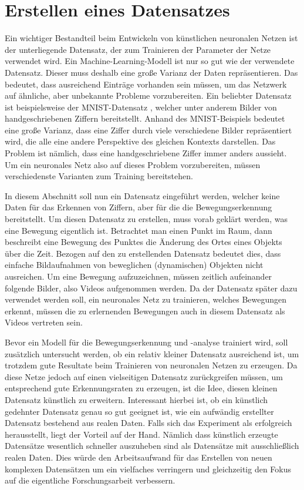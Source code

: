 \chapter{Erstellen eines Datensatzes}\label{chapter:dataset}
Ein wichtiger Bestandteil beim Entwickeln von künstlichen neuronalen Netzen ist
der unterliegende Datensatz, der zum Trainieren der Parameter der Netze
verwendet wird. Ein Machine-Learning-Modell ist nur so gut wie der verwendete
Datensatz. Dieser muss deshalb eine große Varianz der Daten repräsentieren. Das
bedeutet, dass ausreichend Einträge vorhanden sein müssen, um das Netzwerk auf
ähnliche, aber unbekannte Probleme vorzubereiten. Ein beliebter Datensatz ist
beispielsweise der MNIST-Datensatz \cite{6296535}, welcher unter anderem Bilder
von handgeschriebenen Ziffern bereitstellt. Anhand des MNIST-Beispiels bedeutet
eine große Varianz, dass eine Ziffer durch viele verschiedene Bilder
repräsentiert wird, die alle eine andere Perspektive des gleichen Kontexts
darstellen. Das Problem ist nämlich, dass eine handgeschriebene Ziffer immer anders aussieht. Um ein neuronales Netz also auf dieses Problem vorzubereiten, müssen verschiedenste Varianten zum Training bereitstehen.

In diesem Abschnitt soll nun ein Datensatz eingeführt werden, welcher keine
Daten für das Erkennen von Ziffern, aber für die die Bewegungserkennung
bereitstellt. Um diesen Datensatz zu erstellen, muss vorab geklärt werden, was
eine Bewegung eigentlich ist. Betrachtet man einen Punkt im Raum, dann
beschreibt eine Bewegung des Punktes die Änderung des Ortes eines Objekts über
die Zeit.  Bezogen auf den zu erstellenden Datensatz bedeutet dies, dass
einfache Bildaufnahmen von beweglichen (dynamischen) Objekten nicht ausreichen.
Um eine Bewegung aufzuzeichnen, müssen zeitlich aufeinander folgende Bilder, also Videos aufgenommen werden. Da der Datensatz später
dazu verwendet werden soll, ein neuronales Netz zu trainieren, welches
Bewegungen erkennt, müssen die zu erlernenden Bewegungen auch in diesem
Datensatz als Videos vertreten sein.

Bevor ein Modell für die Bewegungserkennung und -analyse trainiert wird, soll
zusätzlich untersucht werden, ob ein relativ kleiner Datensatz ausreichend ist,
um trotzdem gute Resultate beim Trainieren von neuronalen Netzen zu erzeugen. Da
diese Netze jedoch auf einen vielseitigen Datensatz zurückgreifen müssen, um
entsprechend gute Erkennungsraten zu erzeugen, ist die Idee, diesen kleinen
Datensatz künstlich zu erweitern. Interessant hierbei ist, ob ein künstlich
gedehnter Datensatz genau so gut geeignet ist, wie ein aufwändig erstellter
Datensatz bestehend aus realen Daten. Falls sich das Experiment als erfolgreich
herausstellt, liegt der Vorteil auf der Hand. Nämlich dass künstlich erzeugte
Datensätze wesentlich schneller auszuheben sind als Datensätze mit
ausschließlich realen Daten. Dies würde den Arbeitsaufwand für das Erstellen von
neuen komplexen Datensätzen um ein vielfaches verringern und gleichzeitig den
Fokus auf die eigentliche Forschungsarbeit verbessern.

